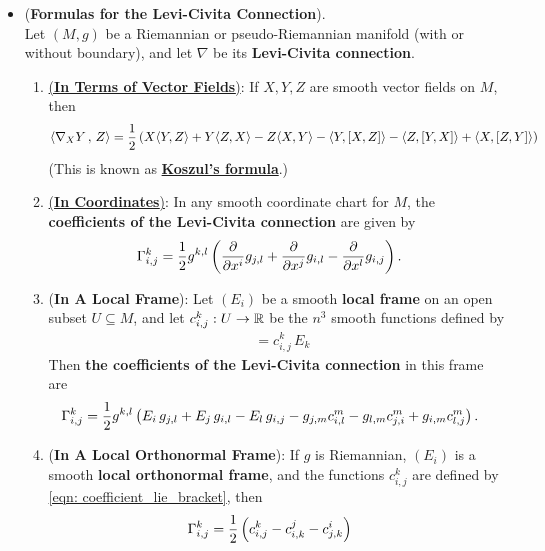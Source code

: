 \documentclass[11pt]{article}
\begin{document}
\begin{itemize}
\item \begin{corollary} (\textbf{Formulas for the Levi-Civita Connection}). \citep{lee2018introduction}\\
Let  $(M, g)$ be a Riemannian or pseudo-Riemannian manifold (with or without boundary), and let $\nabla$ be its \textbf{Levi-Civita connection}.
\begin{enumerate}
\item  \underline{(\textbf{In Terms of Vector Fields})}: If $X, Y, Z$ are smooth vector fields on $M$, then
\begin{align}
\left\langle \nabla_{X}{Y}\,,\, Z \right\rangle &=\frac{1}{2}\left(X\langle{Y,Z}\rangle + Y\langle{Z,X}\rangle - Z\langle{X,Y}\rangle -  \langle{Y, [X, Z]}\rangle - \langle{Z, [Y, X]}\rangle + \langle{X, [Z, Y]}\rangle\right)\label{eqn: levi_civita_formula_vector_fields}
\end{align}
(This is known as \underline{\textbf{Koszul's formula}}.)
\item \underline{(\textbf{In Coordinates})}: In any smooth coordinate chart for $M$, the \textbf{coefficients of the Levi-Civita connection} are given by
\begin{align}
\Gamma_{i,j}^{k} &= \frac{1}{2}g^{k,l}\left( \frac{\partial }{ \partial x^i}g_{j,l} + \frac{\partial }{ \partial x^j}g_{i,l} - \frac{\partial }{ \partial x^l}g_{i,j} \right).\label{eqn: levi_civita_formula_christoffel_symbol_metric}
\end{align}
\item (\textbf{In A Local Frame}): Let $(E_i)$ be a smooth \textbf{local frame} on an open subset $U \subseteq M$, and let $c_{i,j}^{k}: U \rightarrow {\mathbb R}$ be the $n^3$ smooth functions defined by
\begin{align}
[E_i, E_j] &= c_{i,j}^k \, E_k\label{eqn: coefficient_lie_bracket}
\end{align}
Then \textbf{the coefficients of the Levi-Civita connection} in this frame are
\begin{align}
\Gamma_{i,j}^{k} &= \frac{1}{2}g^{k,l}\left(E_i\,g_{j,l} + E_j\,g_{i,l} - E_l\,g_{i,j} - g_{j,m}c_{i,l}^{m} - g_{l,m}c_{j,i}^m + g_{i,m}c_{l,j}^m\right). \label{eqn: levi_civita_formula_christoffel_symbol_local_frames}
\end{align}

\item (\textbf{In A Local Orthonormal Frame}): If $g$ is Riemannian, $(E_i)$ is a smooth \textbf{local orthonormal frame}, and the functions $c_{i,j}^k$ are defined by \eqref{eqn: coefficient_lie_bracket}, then
\begin{align}
\Gamma_{i,j}^{k} &= \frac{1}{2}\left( c_{i,j}^{k} - c_{i,k}^{j} - c_{j,k}^{i} \right) \label{eqn: levi_civita_formula_christoffel_symbol_ortho_local_frames}
\end{align}
\end{enumerate}
\end{corollary}


\end{itemize}
\end{document}
